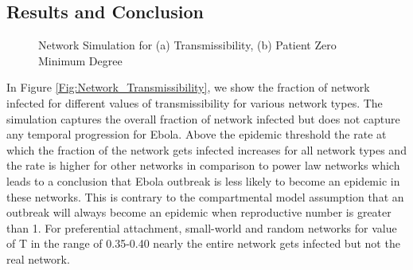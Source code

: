 \documentclass[10pt, journal,onecolumn]{IEEEtran}
\begin{document}
\subsection{{Results and Conclusion}}

\begin{figure}[ht]
\centering
{}
\quad
{}
\caption{Network Simulation for (a) Transmissibility, (b) Patient Zero Minimum Degree}
\end{figure}

In Figure  \ref{Fig:Network_Transmissibility}, we show the fraction of network infected for
different values of transmissibility for  various network types.  The simulation captures the
overall fraction of network infected  but does not capture any temporal progression for Ebola. Above
the epidemic threshold the rate at which the  fraction of the network gets infected increases for
all network types and the rate is higher for other networks in comparison to power law networks
which leads to a conclusion that Ebola outbreak is less likely to become an epidemic in these
networks. This is contrary to the compartmental model assumption that an outbreak will always
become an epidemic when reproductive number is greater than 1. For preferential attachment,
small-world and random networks for value of T in the range of 0.35-0.40 nearly the entire network
gets infected but not the real network.
\end{document}
